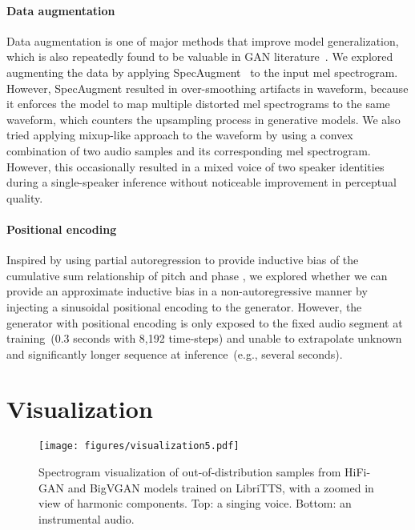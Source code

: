 \documentclass{article} \usepackage{iclr2023_conference,times}
\theoremstyle{plain}
\theoremstyle{definition}
\theoremstyle{remark}
\begin{document}
\paragraph{Data augmentation} Data augmentation is one of major methods that improve model generalization, which is also repeatedly found to be valuable in GAN literature~\citep{karras2020training}. We  explored augmenting the data by applying SpecAugment~\citep{park2019specaugment} to the input mel spectrogram. However, SpecAugment resulted in over-smoothing artifacts in waveform, because it enforces the model to map multiple distorted mel spectrograms to the same waveform, which counters the upsampling process in generative models. We also tried applying mixup-like \citep{zhang2018mixup} approach to the waveform by using a convex combination of two audio samples and its corresponding mel spectrogram. However, this occasionally resulted in a mixed voice of two speaker identities during a single-speaker inference without noticeable improvement in perceptual quality.
\paragraph{Positional encoding} Inspired by using partial autoregression \citep{ping2019waveflow, morrison2021chunked} to provide inductive bias of the cumulative sum relationship of pitch and phase \citep{morrison2021chunked}, we explored whether we can provide an approximate inductive bias in a non-autoregressive manner by injecting a sinusoidal positional encoding \citep{vaswani2017attention} to the generator. 
However, the generator with positional encoding is only exposed to the fixed audio segment at training~(0.3 seconds with 8,192 time-steps) and unable to extrapolate unknown and significantly longer sequence at inference~(e.g., several seconds).




\section{Visualization}
\label{appendix:visualization}

\begin{figure}[h]
\vspace{.3cm}
\centering
\texttt{[image: figures/visualization5.pdf]}
\vspace{-.5cm}
\caption{Spectrogram visualization of out-of-distribution samples from HiFi-GAN and BigVGAN models trained on LibriTTS, with a zoomed in view of harmonic components. Top: a singing voice. Bottom: an instrumental audio.}
\label{fig_visualization_appendix}
\end{figure}
\end{document}
